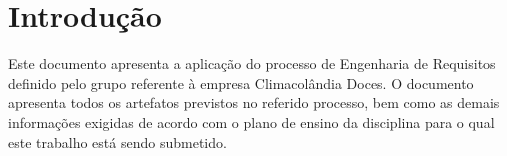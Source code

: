 \chapter*[Introdução]{Introdução}
Este documento apresenta a aplicação do processo de Engenharia de Requisitos definido pelo grupo referente à empresa Climacolândia Doces. O documento apresenta todos os artefatos previstos no referido processo, bem como as demais informações exigidas de acordo com o plano de ensino da disciplina para o qual este trabalho está sendo submetido.